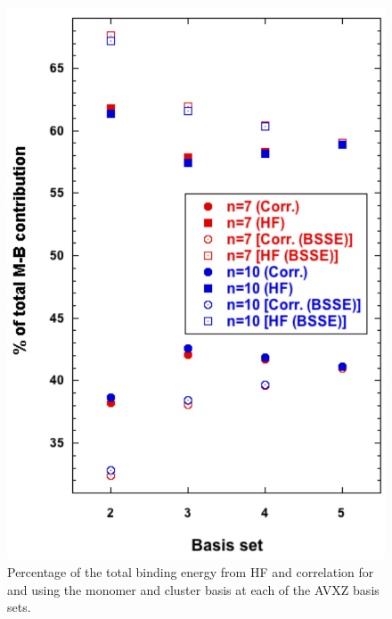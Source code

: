 \begin{figure}[h]
\uwsinglespace
\centering
\includegraphics[width=.5\textwidth]{Figures/Chapter_2/percent_corr_HF_7_10.pdf}
\caption[Percentage of the total binding energy from HF and correlation for  and  using the monomer and cluster basis at each of the AVXZ basis sets.]{Percentage of the total binding energy from HF and correlation for  and  using the monomer and cluster basis at each of the AVXZ basis sets.}
\label{fig:MBE_I_F8}
\end{figure}